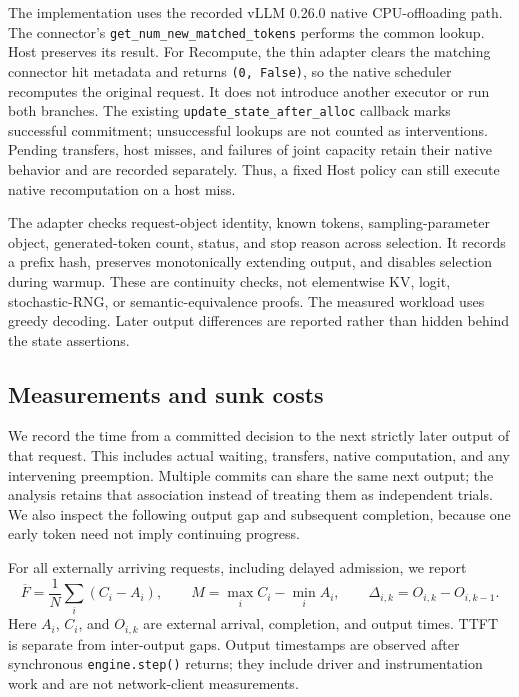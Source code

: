 \documentclass[10pt,a4paper]{article}
\begin{document}
The implementation uses the recorded vLLM 0.26.0 native CPU-offloading path.
The connector's \texttt{get\_num\_new\_matched\_tokens} performs the common lookup.
Host preserves its result. For Recompute, the thin adapter clears the matching
connector hit metadata and returns \texttt{(0, False)}, so the native scheduler
recomputes the original request. It does not introduce another executor or run
both branches. The existing \texttt{update\_state\_after\_alloc} callback marks
successful commitment; unsuccessful lookups are not counted as interventions.
Pending transfers, host misses, and failures of joint capacity retain their
native behavior and are recorded separately. Thus, a fixed Host policy can
still execute native recomputation on a host miss.

The adapter checks request-object identity, known tokens, sampling-parameter
object, generated-token count, status, and stop reason across selection.
It records a prefix hash, preserves monotonically extending output, and disables
selection during warmup. These are continuity checks, not elementwise KV,
logit, stochastic-RNG, or semantic-equivalence proofs. The measured workload
uses greedy decoding. Later output differences are reported rather than hidden
behind the state assertions.

\subsection{Measurements and sunk costs}
We record the time from a committed decision to the next strictly later output
of that request. This includes actual waiting, transfers, native computation,
and any intervening preemption. Multiple commits can share the same next
output; the analysis retains that association instead of treating them as
independent trials. We also inspect the following output gap and subsequent
completion, because one early token need not imply continuing progress.

For all externally arriving requests, including delayed admission, we report
\begin{equation}
 \overline F=\frac{1}{N}\sum_i(C_i-A_i),\qquad
 M=\max_i C_i-\min_i A_i,\qquad
 \Delta_{i,k}=O_{i,k}-O_{i,k-1}.
\end{equation}
Here $A_i$, $C_i$, and $O_{i,k}$ are external arrival, completion, and output
times. TTFT is separate from inter-output gaps. Output timestamps are observed
after synchronous \texttt{engine.step()} returns; they include driver and
instrumentation work and are not network-client measurements.
\end{document}
